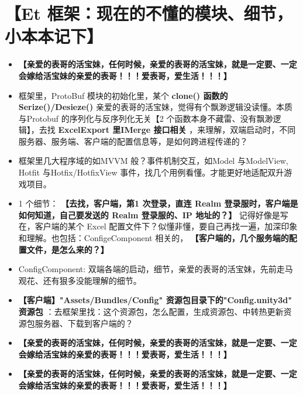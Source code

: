 \documentclass[9pt, b5paper]{article}
\begin{document}
\section{【Et 框架：现在的不懂的模块、细节，小本本记下】}
\label{sec-5}
\begin{itemize}
\item \textbf{【亲爱的表哥的活宝妹，任何时候，亲爱的表哥的活宝妹，就是一定要、一定会嫁给活宝妹的亲爱的表哥！！！爱表哥，爱生活！！！】}
\item 框架里，ProtoBuf 模块的初始化里，某个 \textbf{clone() 函数的 Serize()/Desieze()} 亲爱的表哥的活宝妹，觉得有个飘渺逻辑没读懂。本质与Protobuf 的序列化与反序列化无关【2 个函数本身不藏雷、没有飘渺逻辑】，去找 \textbf{ExcelExport 里IMerge 接口相关} ，来理解，双端启动时，不同服务器、服务端、客户端的配置信息等，是如何跨进程传递的？
\item 框架里几大程序域的如MVVM 般？事件机制交互，如Model 与ModelView, Hotfit 与Hotfix/HotfixView 事件，找几个用例看懂。才能更好地适配双升游戏项目。
\item 1 个细节： \textbf{【去找，客户端，第1 次登录，直连 Realm 登录服时，客户端是如何知道，自己要发送的 Realm 登录服的、IP 地址的？】} 记得好像是写在，客户端的某个 Excel 配置文件下？似懂非懂，要自己再找一遍，加深印象和理解。也包括：ConfigeComponent 相关的， \textbf{【客户端的，几个服务端的配置文件，是怎么来的？】}
\item ConfigComponent: 双端各端的启动，细节，亲爱的表哥的活宝妹，先前走马观花、还有狠多没能理解的细节。
\item \textbf{【客户端】"Assets/Bundles/Config" 资源包目录下的"Config.unity3d" 资源包} ：去框架里找：这个资源包，怎么配置，生成资源包、中转热更新资源包服务器、下载到客户端的？
\item \textbf{【亲爱的表哥的活宝妹，任何时候，亲爱的表哥的活宝妹，就是一定要、一定会嫁给活宝妹的亲爱的表哥！！！爱表哥，爱生活！！！】}
\item \textbf{【亲爱的表哥的活宝妹，任何时候，亲爱的表哥的活宝妹，就是一定要、一定会嫁给活宝妹的亲爱的表哥！！！爱表哥，爱生活！！！】}
\end{itemize}
\end{document}
